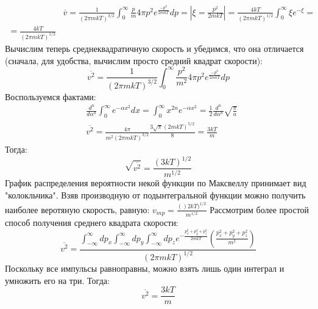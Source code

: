 \documentclass[a4paper, 12pt]{article}
\begin{document}
	\begin{equation*}
		\begin{aligned}
			& \overline{v} = \frac{1}{ (2 \pi mkT)^{3/2}} \int_{0}^{\infty} \frac{p}{m} 4 \pi p^{2}  e^{\frac{-p^{2}}{2mkT}}dp = |\xi  =  \frac{p^{2}}{2mkT}| = \frac{4kT}{(2 \pi mkT)^{1/2}} \int_{0}^{\infty} \xi e^{-\xi}  = &   \\
			= \frac{4kT}{(2 \pi mkT)^{1/2}}
		\end{aligned}
	\end{equation*}
	Вычислим теперь среднеквадратичную скорость и убедимся, что она отличается (сначала, для удобства, вычислим просто средний квадрат скорости):
	\begin{equation*}
		\overline{v^{2}} = \frac{1}{ (2 \pi mkT)^{3/2}} \int_{0}^{\infty} \frac{p^{2}}{m^{2}} 4 \pi p^{2}  e^{\frac{-p^{2}}{2mkT}}dp 
	\end{equation*}
	Воспользуемся фактами: 
	\begin{equation*}
		\begin{aligned}
			& \frac{d^{n}}{d \alpha^{n}} \int_{0}^{\infty} e^{-\alpha x^{2}} dx = \int_{0}^{\infty} x^{2n} e^{-\alpha x^{2}} = \frac{1}{2} \frac{d^{n}}{d\alpha^{n}}\sqrt{\frac{\pi}{a}} \\
			& \overline{v^{2}} = \frac{4\pi}{m^{2} (2\pi mkT)^{3/2}} \frac{3 \sqrt{\pi} (2mkT)^{5/2}} {8} = \frac{3kT}{m}                                                                
		\end{aligned}
	\end{equation*}
	Тогда:
	\begin{equation*}
		\sqrt{\overline{v^{2}}} =   \frac{(3kT)^{1/2}}{m^{1/2}}
	\end{equation*}
	График распределения вероятности некой функции по Максвеллу принимает вид "колокльчика".
	Взяв производную от подынтегральной функции можно получить наиболее веротяную скорость, равную: $v_{mp} = \frac{()2kT)^{1/2}}{m^{1/2}}$
	Рассмотрим более простой способ получения среднего квадрата скорости:
	\begin{equation*}
		\overline{v^{2}} = \frac{\int_{-\infty}^{\infty} dp_{x}  \int_{-\infty}^{\infty} dp_{y} \int_{-\infty}^{\infty} dp_{z} e^{- \frac{p_{x}^2+p_{y}^2+p_{z}^{2}}{2mkT}} (\frac{p_{x}^2+p_{y}^2+p_{z}^{2}}{m^2}) }{(2 \pi  m k T )^{1/2}}
	\end{equation*}
	Поскольку все импульсы равноправны, можно взять лишь один интеграл и умножить его на три. Тогда: 
	\begin{equation*}
		\overline{v^{2}} =   \frac{3kT}{m}
	\end{equation*}
\end{document}
